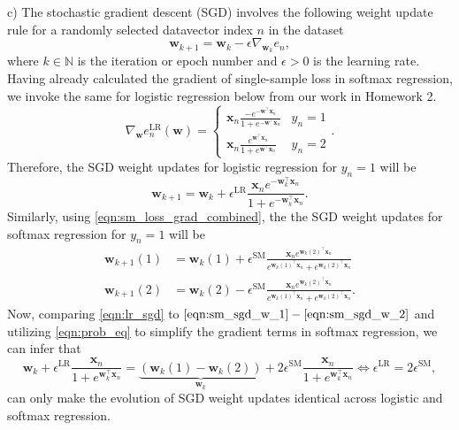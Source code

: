 \documentclass{article}
\newcommand{\N}{\mathbb{N}}
\renewcommand{\vec}[1]{\mathbf{#1}}
\begin{document}
    c) The stochastic gradient descent (SGD) involves the following weight 
    update rule for a randomly selected datavector index $n$ in the dataset
    \begin{equation}
        \vec{w}_{k+1} = \vec{w}_k - \epsilon\nabla_{\vec{w}_k}e_n,
    \end{equation}
    where $k\in\N$ is the iteration or epoch number and $\epsilon>0$ is the 
    learning rate. Having already calculated the gradient of single-sample 
    loss in softmax regression, we invoke the same for logistic regression 
    below from our work in Homework 2.
    \begin{equation}
        \nabla_{\vec{w}}e_n^{\text{LR}}(\vec{w}) = 
        \begin{cases}
            \vec{x}_n\frac{-e^{-\vec{w}^\top\vec{x}_n}}{1+e^{-\vec{w}^\top\vec
            {x}_n}} & y_n = 1\\
            \vec{x}_n\frac{e^{\vec{w}^\top\vec{x}_n}}{1+e^{\vec{w}^\top\vec
            {x}_n}} & y_n = 2
        \end{cases}.
    \end{equation}
    Therefore, the SGD weight updates for logistic regression for $y_n=1$ 
    will be
    \begin{equation}
        \label{eqn:lr_sgd}
        \vec{w}_{k+1} = \vec{w}_k + \epsilon^{\text{LR}}
        \frac{\vec{x}_n e^{-\vec{w}_k^\top\vec{x}_n}}{1+e^{-\vec{w}_k^\top\vec
        {x}_n}}.
    \end{equation}
    Similarly, using \eqref{eqn:sm_loss_grad_combined}, the the SGD weight 
    updates for softmax regression for $y_n=1$ will be
    \begin{align}
        \label{eqn:sm_sgd_w_1}
        \vec{w}_{k+1}(1) &= \vec{w}_k(1) + \epsilon^{\text{SM}}\frac{\vec{x}_n
        e^{\vec{w}_k(2)^\top\vec{x}_n}}{e^{\vec{w}_k(1)^\top\vec{x}_n}+e^{\vec
        {w}_k(2)^\top\vec{x}_n}}\\
        \label{eqn:sm_sgd_w_2}
        \vec{w}_{k+1}(2) &= \vec{w}_k(2) - \epsilon^{\text{SM}}\frac{\vec{x}_n
        e^{\vec{w}_k(2)^\top\vec{x}_n}}{e^{\vec{w}_k(1)^\top\vec{x}_n}+e^{\vec
        {w}_k(2)^\top\vec{x}_n}}.
    \end{align} 
    Now, comparing \eqref{eqn:lr_sgd} to $\eqref{eqn:sm_sgd_w_1}
    -\eqref{eqn:sm_sgd_w_2}$ and utilizing \eqref{eqn:prob_eq} to simplify 
    the gradient terms in softmax regression, we can infer that
    \begin{equation}
        \vec{w}_k + \epsilon^{\text{LR}}\frac{\vec{x}_n}{1+e^{\vec{w}
        _k^\top\vec{x}_n}}=\underbrace{\left(\vec{w}_k(1)-\vec{w}_k(2)\right)}
        _{\vec{w}_k} + 2\epsilon^{\text{SM}}\frac{\vec{x}_n}{1+e^{\vec{w}_k
        ^\top\vec{x}_n}}
        \iff \epsilon^{\text{LR}} = 2\epsilon^{\text{SM}},
    \end{equation}
    can only make the evolution of SGD weight updates identical across 
    logistic and softmax regression.
\end{document}
